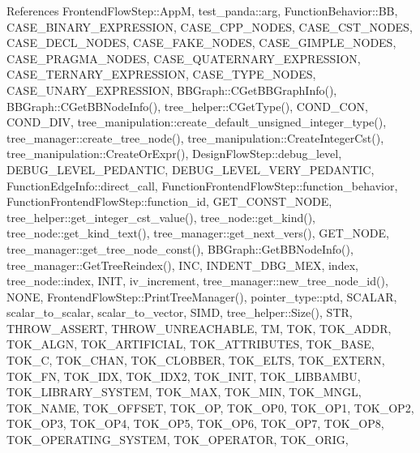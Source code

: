 References Frontend\+Flow\+Step\+::\+AppM, test\+\_\+panda\+::arg, Function\+Behavior\+::\+BB, C\+A\+S\+E\+\_\+\+B\+I\+N\+A\+R\+Y\+\_\+\+E\+X\+P\+R\+E\+S\+S\+I\+ON, C\+A\+S\+E\+\_\+\+C\+P\+P\+\_\+\+N\+O\+D\+ES, C\+A\+S\+E\+\_\+\+C\+S\+T\+\_\+\+N\+O\+D\+ES, C\+A\+S\+E\+\_\+\+D\+E\+C\+L\+\_\+\+N\+O\+D\+ES, C\+A\+S\+E\+\_\+\+F\+A\+K\+E\+\_\+\+N\+O\+D\+ES, C\+A\+S\+E\+\_\+\+G\+I\+M\+P\+L\+E\+\_\+\+N\+O\+D\+ES, C\+A\+S\+E\+\_\+\+P\+R\+A\+G\+M\+A\+\_\+\+N\+O\+D\+ES, C\+A\+S\+E\+\_\+\+Q\+U\+A\+T\+E\+R\+N\+A\+R\+Y\+\_\+\+E\+X\+P\+R\+E\+S\+S\+I\+ON, C\+A\+S\+E\+\_\+\+T\+E\+R\+N\+A\+R\+Y\+\_\+\+E\+X\+P\+R\+E\+S\+S\+I\+ON, C\+A\+S\+E\+\_\+\+T\+Y\+P\+E\+\_\+\+N\+O\+D\+ES, C\+A\+S\+E\+\_\+\+U\+N\+A\+R\+Y\+\_\+\+E\+X\+P\+R\+E\+S\+S\+I\+ON, B\+B\+Graph\+::\+C\+Get\+B\+B\+Graph\+Info(), B\+B\+Graph\+::\+C\+Get\+B\+B\+Node\+Info(), tree\+\_\+helper\+::\+C\+Get\+Type(), C\+O\+N\+D\+\_\+\+C\+ON, C\+O\+N\+D\+\_\+\+D\+IV, tree\+\_\+manipulation\+::create\+\_\+default\+\_\+unsigned\+\_\+integer\+\_\+type(), tree\+\_\+manager\+::create\+\_\+tree\+\_\+node(), tree\+\_\+manipulation\+::\+Create\+Integer\+Cst(), tree\+\_\+manipulation\+::\+Create\+Or\+Expr(), Design\+Flow\+Step\+::debug\+\_\+level, D\+E\+B\+U\+G\+\_\+\+L\+E\+V\+E\+L\+\_\+\+P\+E\+D\+A\+N\+T\+IC, D\+E\+B\+U\+G\+\_\+\+L\+E\+V\+E\+L\+\_\+\+V\+E\+R\+Y\+\_\+\+P\+E\+D\+A\+N\+T\+IC, Function\+Edge\+Info\+::direct\+\_\+call, Function\+Frontend\+Flow\+Step\+::function\+\_\+behavior, Function\+Frontend\+Flow\+Step\+::function\+\_\+id, G\+E\+T\+\_\+\+C\+O\+N\+S\+T\+\_\+\+N\+O\+DE, tree\+\_\+helper\+::get\+\_\+integer\+\_\+cst\+\_\+value(), tree\+\_\+node\+::get\+\_\+kind(), tree\+\_\+node\+::get\+\_\+kind\+\_\+text(), tree\+\_\+manager\+::get\+\_\+next\+\_\+vers(), G\+E\+T\+\_\+\+N\+O\+DE, tree\+\_\+manager\+::get\+\_\+tree\+\_\+node\+\_\+const(), B\+B\+Graph\+::\+Get\+B\+B\+Node\+Info(), tree\+\_\+manager\+::\+Get\+Tree\+Reindex(), I\+NC, I\+N\+D\+E\+N\+T\+\_\+\+D\+B\+G\+\_\+\+M\+EX, index, tree\+\_\+node\+::index, I\+N\+IT, iv\+\_\+increment, tree\+\_\+manager\+::new\+\_\+tree\+\_\+node\+\_\+id(), N\+O\+NE, Frontend\+Flow\+Step\+::\+Print\+Tree\+Manager(), pointer\+\_\+type\+::ptd, S\+C\+A\+L\+AR, scalar\+\_\+to\+\_\+scalar, scalar\+\_\+to\+\_\+vector, S\+I\+MD, tree\+\_\+helper\+::\+Size(), S\+TR, T\+H\+R\+O\+W\+\_\+\+A\+S\+S\+E\+RT, T\+H\+R\+O\+W\+\_\+\+U\+N\+R\+E\+A\+C\+H\+A\+B\+LE, TM, T\+OK, T\+O\+K\+\_\+\+A\+D\+DR, T\+O\+K\+\_\+\+A\+L\+GN, T\+O\+K\+\_\+\+A\+R\+T\+I\+F\+I\+C\+I\+AL, T\+O\+K\+\_\+\+A\+T\+T\+R\+I\+B\+U\+T\+ES, T\+O\+K\+\_\+\+B\+A\+SE, T\+O\+K\+\_\+C, T\+O\+K\+\_\+\+C\+H\+AN, T\+O\+K\+\_\+\+C\+L\+O\+B\+B\+ER, T\+O\+K\+\_\+\+E\+L\+TS, T\+O\+K\+\_\+\+E\+X\+T\+E\+RN, T\+O\+K\+\_\+\+FN, T\+O\+K\+\_\+\+I\+DX, T\+O\+K\+\_\+\+I\+D\+X2, T\+O\+K\+\_\+\+I\+N\+IT, T\+O\+K\+\_\+\+L\+I\+B\+B\+A\+M\+BU, T\+O\+K\+\_\+\+L\+I\+B\+R\+A\+R\+Y\+\_\+\+S\+Y\+S\+T\+EM, T\+O\+K\+\_\+\+M\+AX, T\+O\+K\+\_\+\+M\+IN, T\+O\+K\+\_\+\+M\+N\+GL, T\+O\+K\+\_\+\+N\+A\+ME, T\+O\+K\+\_\+\+O\+F\+F\+S\+ET, T\+O\+K\+\_\+\+OP, T\+O\+K\+\_\+\+O\+P0, T\+O\+K\+\_\+\+O\+P1, T\+O\+K\+\_\+\+O\+P2, T\+O\+K\+\_\+\+O\+P3, T\+O\+K\+\_\+\+O\+P4, T\+O\+K\+\_\+\+O\+P5, T\+O\+K\+\_\+\+O\+P6, T\+O\+K\+\_\+\+O\+P7, T\+O\+K\+\_\+\+O\+P8, T\+O\+K\+\_\+\+O\+P\+E\+R\+A\+T\+I\+N\+G\+\_\+\+S\+Y\+S\+T\+EM, T\+O\+K\+\_\+\+O\+P\+E\+R\+A\+T\+OR, T\+O\+K\+\_\+\+O\+R\+IG, 